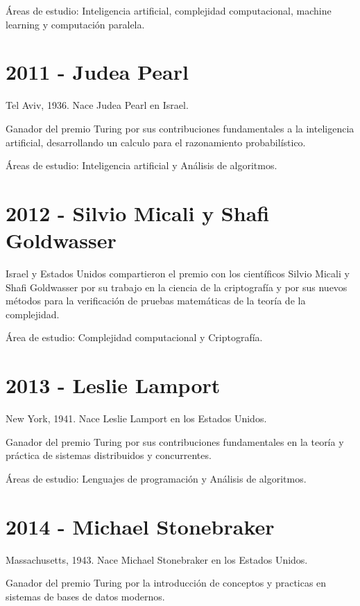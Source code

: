 \documentclass[notitlepage,letterpaper, 11pt]{article}
\begin{document}
\noindent Áreas de estudio: Inteligencia artificial, complejidad computacional, machine learning y computación paralela.
\newline

\section*{2011 - Judea Pearl}
\noindent Tel Aviv, 1936. Nace Judea Pearl en Israel.

\noindent Ganador del premio Turing por sus contribuciones fundamentales a la inteligencia artificial, desarrollando un calculo para el razonamiento probabilístico.

\noindent Áreas de estudio: Inteligencia artificial y Análisis de algoritmos.
\newline

\section*{2012 - Silvio Micali y Shafi Goldwasser}
\noindent Israel y Estados Unidos compartieron el premio con los científicos Silvio Micali y Shafi Goldwasser por su trabajo en la ciencia de la criptografía y por sus nuevos métodos para la verificación de pruebas matemáticas de la teoría de la complejidad.

\noindent Área de estudio: Complejidad computacional y Criptografía.
\newline

\section*{2013 - Leslie Lamport}
\noindent New York, 1941. Nace Leslie Lamport en los Estados Unidos.

\noindent Ganador del premio Turing por sus contribuciones fundamentales en la teoría y práctica de sistemas distribuidos y concurrentes.

\noindent Áreas de estudio: Lenguajes de programación y Análisis de algoritmos.
\newline

\section*{2014 - Michael Stonebraker}
\noindent Massachusetts, 1943. Nace Michael Stonebraker en los Estados Unidos.

\noindent Ganador del premio Turing por la introducción de conceptos y practicas en sistemas de bases de datos modernos.
\end{document}
